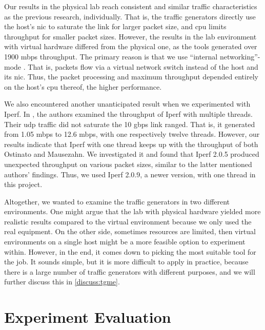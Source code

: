 \skippara Our results in the physical lab reach consistent and similar traffic characteristics as the previous research, \cite{kolahi2011performance, srivastava2014evaluation, srivastava2014comparative} individually.
That is, the traffic generators directly use the host's \acrshort{nic} to saturate the link for larger packet size, and \acrshort{cpu} limits throughput for smaller packet sizes.
However, the results in the lab environment with virtual hardware differed from the physical one, as the tools generated over 1900 \acrshort{mbps} throughput.
The primary reason is that we use ``internal networking''-mode \cite{Chapter680:online}.
That is, packets flow via a virtual network switch instead of the host and its \acrshort{nic}.
Thus, the packet processing and maximum throughput depended entirely on the host's \acrshort{cpu} thereof, the higher performance.

\skippara We also encountered another unanticipated result when we experimented with Iperf.
In \cite{srivastava2014comparative}, the authors examined the throughput of Iperf with multiple threads.
Their \acrshort{udp} traffic did not saturate the 10 \acrshort{gbps} link ranged.
That is, it generated from 1.05 \acrshort{mbps} to 12.6 \acrshort{mbps}, with one respectively twelve threads.
However, our results indicate that Iperf with one thread keeps up with the throughput of both Ostinato and Mausezahn.
We investigated it and found that Iperf 2.0.5 produced unexpected throughput on various packet sizes, similar to the latter mentioned authors' findings.
Thus, we used Iperf 2.0.9, a newer version, with one thread in this project.

\skippara Altogether, we wanted to examine the traffic generators in two different environments.
One might argue that the lab with physical hardware yielded more realistic results compared to the virtual environment because we only used the real equipment.
On the other side, sometimes resources are limited, then virtual environments on a single host might be a more feasible option to experiment within.
However, in the end, it comes down to picking the most suitable tool for the job.
It sounds simple, but it is more difficult to apply in practice, because there is a large number of traffic generators with different purposes, and we will further discuss this in \cref{discuss:tgme}.

\section{Experiment Evaluation}

